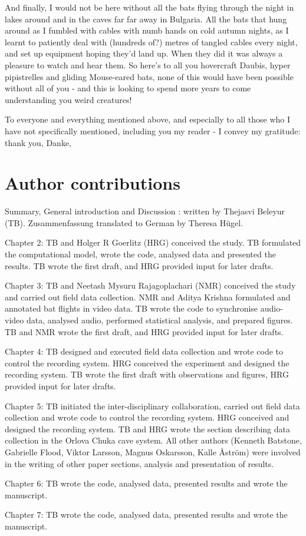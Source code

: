 \documentclass[
]{book}
\begin{document}
And finally, I would not be here without all the bats flying through the night in lakes around and in the caves far far away in Bulgaria. All the bats that hung around as I fumbled with cables with numb hands on cold autumn nights, as I learnt to patiently deal with (hundreds of?) metres of tangled cables every night, and set up equipment hoping they'd land up. When they did it was always a pleasure to watch and hear them. So here's to all you hovercraft Daubis, hyper pipistrelles and gliding Mouse-eared bats, none of this would have been possible without all of you - and this is looking to spend more years to come understanding you weird creatures!

To everyone and everything mentioned above, and especially to all those who I have not specifically mentioned, including you my reader - I convey my gratitude: thank you, Danke,

\hypertarget{author-contributions-2}{%
\chapter{Author contributions}\label{author-contributions-2}}

Summary, General introduction and Discussion : written by Thejasvi Beleyur (TB).
Zusammenfassung translated to German by Theresa Hügel.

Chapter 2: TB and Holger R Goerlitz (HRG) conceived the study. TB formulated the computational model, wrote the code, analysed data and presented the results. TB wrote the first draft, and HRG provided input for later drafts.

Chapter 3: TB and Neetash Mysuru Rajagoplachari (NMR) conceived the study and carried out field data collection. NMR and Aditya Krishna formulated and annotated bat flights in video data. TB wrote the code to synchronise audio-video data, analysed audio, performed statistical analysis, and prepared figures. TB and NMR wrote the first draft, and HRG provided input for later drafts.

Chapter 4: TB designed and executed field data collection and wrote code to control the recording system. HRG conceived the experiment and designed the recording system. TB wrote the first draft with observations and figures, HRG provided input for later drafts.

Chapter 5: TB initiated the inter-disciplinary collaboration, carried out field data collection and wrote code to control the recording system. HRG conceived and designed the recording system. TB and HRG wrote the section describing data collection in the Orlova Chuka cave system. All other authors (Kenneth Batstone, Gabrielle Flood, Viktor Larsson, Magnus Oskarsson, Kalle Åström) were involved in the writing of other paper sections, analysis and presentation of results.

Chapter 6: TB wrote the code, analysed data, presented results and wrote the manuscript.

Chapter 7: TB wrote the code, analysed data, presented results and wrote the manuscript.

  
\end{document}
